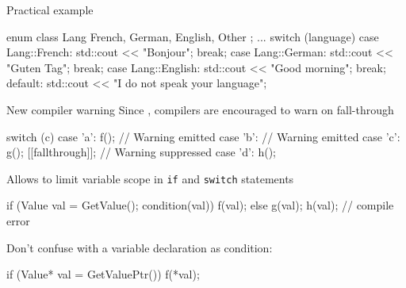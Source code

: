 \begin{frame}[fragile]
  \begin{exampleblock}{Practical example}
    \begin{cppcode*}{}
      enum class Lang { French, German, English, Other };
      ...
      switch (language) {
      case Lang::French:
        std::cout << "Bonjour";
        break;
       case Lang::German:
        std::cout << "Guten Tag";
        break;
      case Lang::English:
        std::cout << "Good morning";
        break;
      default:
        std::cout << "I do not speak your language";
      }
    \end{cppcode*}
  \end{exampleblock}
\end{frame}


\begin{frame}[fragile]
  \begin{block}{New compiler warning}
    Since , compilers are encouraged to warn on fall-through
  \end{block}
  \begin{exampleblock}{}
    \begin{cppcode*}{}
      switch (c) {
        case 'a':
          f();    // Warning emitted
        case 'b': // Warning emitted
        case 'c':
          g();
          [[fallthrough]]; // Warning suppressed
        case 'd':
          h();
      }
    \end{cppcode*}
  \end{exampleblock}
\end{frame}

\begin{frame}[fragile]
  \begin{block}{}
    Allows to limit variable scope in \texttt{if} and \texttt{switch} statements
  \end{block}
  \begin{exampleblock}{}
    \begin{cppcode*}{}
      if (Value val = GetValue(); condition(val)) {
        f(val);
      } else {
        g(val);
      }
      h(val); // compile error
    \end{cppcode*}
  \end{exampleblock}
  \pause
  \begin{alertblock}{}
    Don't confuse with a variable declaration as condition:
    \begin{cppcode*}{}
      if (Value* val = GetValuePtr())
        f(*val);
    \end{cppcode*}
  \end{alertblock}
\end{frame}

